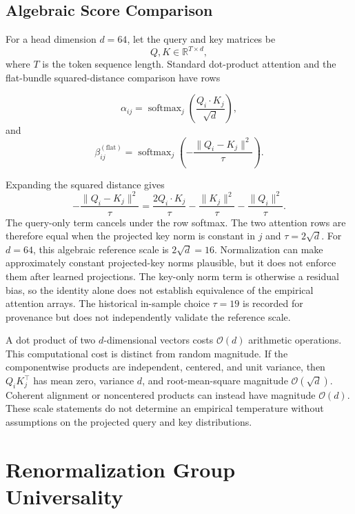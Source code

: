 \documentclass[twoside,11pt]{article}
\begin{document}
\subsection{Algebraic Score Comparison}

For a head dimension $d=64$, let the query and key matrices be
\[
Q,K \in \mathbb{R}^{T \times d},
\]
where $T$ is the token sequence length. Standard dot-product attention and the flat-bundle squared-distance comparison have rows

\begin{equation}
\alpha_{ij} = \operatorname{softmax}_j \left( \frac{Q_i \cdot K_j}{\sqrt{d}} \right),
\end{equation}
and
\begin{equation}
\beta^{(\mathrm{flat})}_{ij} = \operatorname{softmax}_j \left( -\frac{\|Q_i - K_j\|^2}{\tau} \right).
\end{equation}

Expanding the squared distance gives
\begin{equation}
-\frac{\|Q_i-K_j\|^2}{\tau}
=\frac{2Q_i\cdot K_j}{\tau}
-\frac{\|K_j\|^2}{\tau}
-\frac{\|Q_i\|^2}{\tau}.
\end{equation}
The query-only term cancels under the row softmax. The two attention rows are therefore equal when the projected key norm is constant in $j$ and $\tau=2\sqrt{d}$. For $d=64$, this algebraic reference scale is $2\sqrt{d}=16$. Normalization can make approximately constant projected-key norms plausible, but it does not enforce them after learned projections. The key-only norm term is otherwise a residual bias, so the identity alone does not establish equivalence of the empirical attention arrays. The historical in-sample choice $\tau=19$ is recorded for provenance but does not independently validate the reference scale.

A dot product of two $d$-dimensional vectors costs $\mathcal{O}(d)$ arithmetic operations. This computational cost is distinct from random magnitude. If the componentwise products are independent, centered, and unit variance, then $Q_iK_j^\top$ has mean zero, variance $d$, and root-mean-square magnitude $\mathcal{O}(\sqrt{d})$. Coherent alignment or noncentered products can instead have magnitude $\mathcal{O}(d)$. These scale statements do not determine an empirical temperature without assumptions on the projected query and key distributions.


\section{Renormalization Group Universality}
\label{app:rg_universality}
\end{document}
